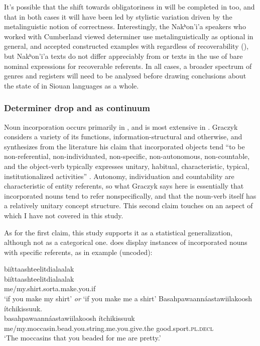 \documentclass[output=paper]{LSP/langsci}
\begin{document}
	It’s possible that the shift towards obligatoriness in  will be completed in  too, and that in both cases it will have been led by stylistic variation driven by the metalinguistic notion of correctness. Interestingly, the Nakʰon’i’a speakers who worked with Cumberland viewed determiner use metalinguistically as optional in general, and accepted constructed examples with  regardless of recoverability (\citealt[345]{Cumberland2005}), but Nakʰon’i’a texts do not differ appreciably from  or  texts in the use of bare nominal expressions for recoverable referents. In all cases, a broader spectrum of genres and registers will need to be analysed before drawing conclusions about the state of  in Siouan languages as a whole.

\subsubsection{Determiner drop and  as continuum}\label{dropincorp}

Noun incorporation occurs primarily in , and is most extensive in . Graczyk considers a variety of its functions, information-structural and otherwise, and synthesizes from the literature his claim that incorporated objects tend “to be non-referential, non-individuated, non-specific, non-autonomous, non-countable, and the object-verb  typically expresses unitary, habitual, characteristic, typical, institutionalized activities” \citeyearpar[244]{Graczyk1991a}. Autonomy, individuation and countability are characteristic of entity referents, so what Graczyk says here is essentially that incorporated nouns tend to refer nonspecifically, and that the noun-verb  itself has a relatively unitary concept structure. This second claim touches on an aspect of  which I have not covered in this study.

As for the first claim, this study supports it as a statistical generalization, although not as a categorical one.  does display instances of incorporated nouns with specific referents, as in example  (uncoded):

\ea\label{shirtmoccasin}
\ea\label{incorpshirt}
biíttaashteelitdialaalak\footnotemark\\
\gll	biíttaashteelitdialaalak\\
	me/my.shirt.sorta.make.you.if\\
\glt	`if you make my shirt' \emph{or} `if you make me a shirt'
\ex\label{incorpmoccasin}
Basahpawaannáastawiilakoosh ítchikissuuk.\footnotemark\\
\gll	basahpawaannáastawiilakoosh					ítchikissuuk\\
	me/my.moccasin.bead.you.string.me.you.give.the 		good.sport.\textsc{pl.decl}\\
\glt	`The moccasins that you beaded for me are pretty.' 
\z\z
\end{document}
